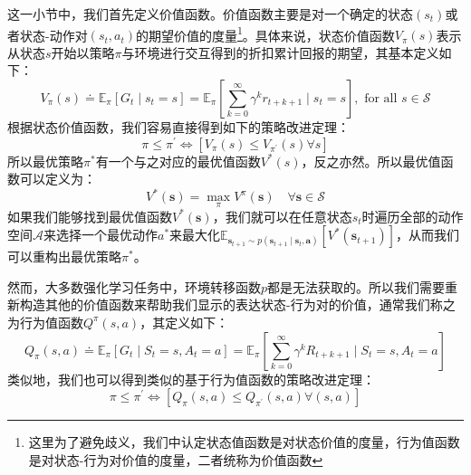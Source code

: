 这一小节中，我们首先定义价值函数。价值函数主要是对一个确定的状态$(s_t)$或者状态-动作对$(s_t,a_t)$的期望价值的度量\footnote{这里为了避免歧义，我们中认定状态值函数是对状态价值的度量，行为值函数是对状态-行为对价值的度量，二者统称为价值函数}。具体来说，状态价值函数$V_{\pi}(s)$表示从状态$s$开始以策略$\pi$与环境进行交互得到的折扣累计回报的期望，其基本定义如下：
\begin{equation}
    \label{Equ: value function}
    V_{\pi}(s) \doteq \mathbb{E}_{\pi}\left[G_{t} \mid s_{t}=s\right]=\mathbb{E}_{\pi}\left[\sum_{k=0}^{\infty} \gamma^{k} r_{t+k+1} \mid s_{t}=s\right], \text { for all } s \in \mathcal{S}
\end{equation}
根据状态价值函数，我们容易直接得到如下的策略改进定理：
\begin{equation}
    \label{Equ : policy improvemnt theroem based on v}
    \pi \leq \pi^{\prime} \Longleftrightarrow\left[V_{\pi}(s) \leq V_{\pi^{\prime}}(s) \forall s\right]
\end{equation}
所以最优策略$\pi^*$有一个与之对应的最优值函数$V^{*}(s)$，反之亦然。所以最优值函数可以定义为：
\begin{equation}
    \label{Equ: optimal value function}
    V^{*}(\mathbf{s})=\max _{\pi} V^{\pi}(\mathbf{s}) \quad \forall \mathbf{s} \in \mathcal{S}
\end{equation}
如果我们能够找到最优值函数$V^{*}(\mathbf{s})$，我们就可以在任意状态$s_t$时遍历全部的动作空间$\mathcal{A}$来选择一个最优动作$a^*$来最大化$\mathbb{E}_{\mathbf{s}_{t+1} \sim p\left(\mathbf{s}_{t+1} \mid \mathbf{s}_{t}, \mathbf{a}\right)}\left[V^{*}\left(\mathbf{s}_{t+1}\right)\right]$，从而我们可以重构出最优策略$\pi^*$。

然而，大多数强化学习任务中，环境转移函数$p$都是无法获取的。所以我们需要重新构造其他的价值函数来帮助我们显示的表达状态-行为对的价值，通常我们称之为行为值函数$Q^{\pi}(s,a)$，其定义如下：
\begin{equation}
    \label{Equ: action-value function}
    Q_{\pi}(s, a) \doteq \mathbb{E}_{\pi}\left[G_{t} \mid S_{t}=s, A_{t}=a\right]=\mathbb{E}_{\pi}\left[\sum_{k=0}^{\infty} \gamma^{k} R_{t+k+1} \mid S_{t}=s, A_{t}=a\right]
\end{equation}
类似地，我们也可以得到类似的基于行为值函数的策略改进定理：
\begin{equation}
\label{Equ : policy improvemnt theroem based on q}
    \pi \leq \pi^{\prime} \Longleftrightarrow \left[Q_{\pi}(s, a) \leq Q_{\pi^{\prime}}(s, a) \forall(s, a)\right]
\end{equation}

